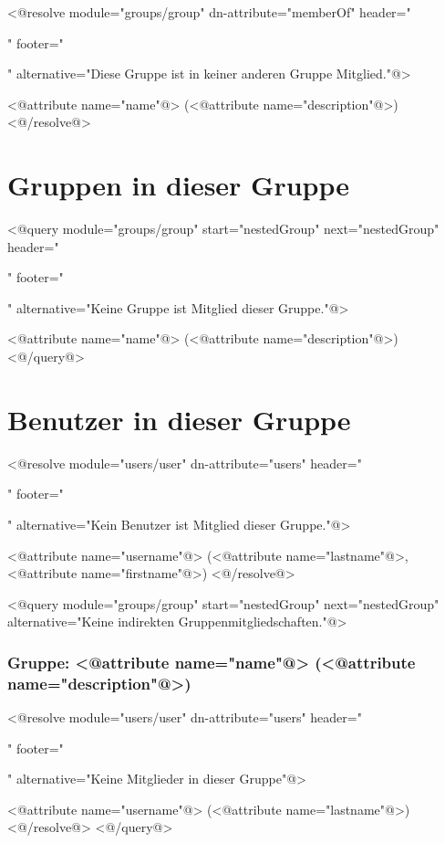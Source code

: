 <@resolve module="groups/group" dn-attribute="memberOf" header="\begin{itemize}" footer="\end{itemize}" alternative="Diese Gruppe ist in keiner anderen Gruppe Mitglied."@>
\item <@attribute name="name"@> (<@attribute name="description"@>)
<@/resolve@>


\section*{Gruppen in dieser Gruppe}

<@query module="groups/group" start="nestedGroup" next="nestedGroup" header="\begin{itemize}" footer="\end{itemize}" alternative="Keine Gruppe ist Mitglied dieser Gruppe."@>
  \item <@attribute name="name"@> (<@attribute name="description"@>)
<@/query@>

\section*{Benutzer in dieser Gruppe}

<@resolve module="users/user" dn-attribute="users" header="\begin{itemize}" footer="\end{itemize}" alternative="Kein Benutzer ist Mitglied dieser Gruppe."@>
  \item <@attribute name="username"@> (<@attribute name="lastname"@>, <@attribute name="firstname"@>)
<@/resolve@>

<@query module="groups/group" start="nestedGroup" next="nestedGroup" alternative="Keine indirekten Gruppenmitgliedschaften."@>
  \subsubsection*{Gruppe: <@attribute name="name"@> (<@attribute name="description"@>)}
  <@resolve module="users/user" dn-attribute="users" header="\begin{itemize}" footer="\end{itemize}" alternative="Keine Mitglieder in dieser Gruppe"@>
    \item <@attribute name="username"@> (<@attribute name="lastname"@>)
  <@/resolve@>
<@/query@>

\newpage
